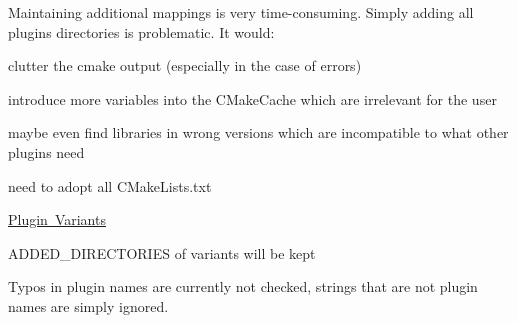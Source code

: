 Maintaining additional mappings is very time-\/consuming. Simply adding all plugins directories is problematic. It would\+:


\begin{DoxyItemize}
\item clutter the cmake output (especially in the case of errors)
\item introduce more variables into the C\+Make\+Cache which are irrelevant for the user
\item maybe even find libraries in wrong versions which are incompatible to what other plugins need
\end{DoxyItemize}


\begin{DoxyItemize}
\item need to adopt all C\+Make\+Lists.\+txt
\end{DoxyItemize}


\begin{DoxyItemize}
\item \mbox{\hyperlink{doc_decisions_plugin_variants_md}{Plugin Variants}}
\end{DoxyItemize}


\begin{DoxyItemize}
\item {\ttfamily A\+D\+D\+E\+D\+\_\+\+D\+I\+R\+E\+C\+T\+O\+R\+I\+ES} of variants will be kept
\item Typos in plugin names are currently not checked, strings that are not plugin names are simply ignored. 
\end{DoxyItemize}
